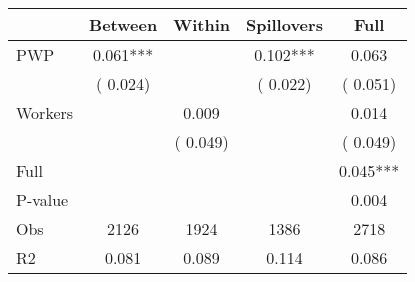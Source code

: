 
\begin{tabular}{l*{4}{c}}\hline&\multicolumn{1}{c}{Between}&\multicolumn{1}{c}{Within}&\multicolumn{1}{c}{Spillovers}&\multicolumn{1}{c}{Full}\\ \hline
 PWP           &              0.061***      &                                               &        0.102*** &         0.063                            \\ 
                               &        (       0.024)           &                                       &       (       0.022)     &      (       0.051)                                           \\ 
 Workers       &                                               &        0.009    &                                &             0.014                            \\ 
                               &                                               & (       0.049)                  &                                        &      (       0.049)                                           \\ 
\hline                                                                                                                                                                                                                                            
 Full                  &                                               &                                               &                                        &             0.045***                                     \\ 
 P-value               &                                               &                                               &                                        &             0.004                                           \\ 
 Obs                   &               2126               &       1924                       &       1386                &              2718                                               \\ 
 R2                    &                      0.081              &              0.089                      &              0.114               &                     0.086                                              \\ 
\hline \end{tabular}                                                                                                                                                                                                              